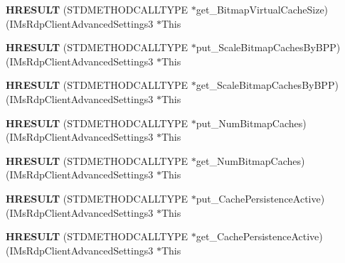 \begin{DoxyCompactItemize}
{\bfseries H\+R\+E\+S\+U\+LT} (S\+T\+D\+M\+E\+T\+H\+O\+D\+C\+A\+L\+L\+T\+Y\+PE $\ast$get\+\_\+\+Bitmap\+Virtual\+Cache\+Size)(I\+Ms\+Rdp\+Client\+Advanced\+Settings3 $\ast$This
\item 
\mbox{\label{struct_i_ms_rdp_client_advanced_settings3_vtbl_a8caf545c6f0f7c16dba2940960bb2e83}} 
{\bfseries H\+R\+E\+S\+U\+LT} (S\+T\+D\+M\+E\+T\+H\+O\+D\+C\+A\+L\+L\+T\+Y\+PE $\ast$put\+\_\+\+Scale\+Bitmap\+Caches\+By\+B\+PP)(I\+Ms\+Rdp\+Client\+Advanced\+Settings3 $\ast$This
\item 
\mbox{\label{struct_i_ms_rdp_client_advanced_settings3_vtbl_aaefbe7367a5bf2621ff417bcd3383613}} 
{\bfseries H\+R\+E\+S\+U\+LT} (S\+T\+D\+M\+E\+T\+H\+O\+D\+C\+A\+L\+L\+T\+Y\+PE $\ast$get\+\_\+\+Scale\+Bitmap\+Caches\+By\+B\+PP)(I\+Ms\+Rdp\+Client\+Advanced\+Settings3 $\ast$This
\item 
\mbox{\label{struct_i_ms_rdp_client_advanced_settings3_vtbl_a9644b4121d99899c38ababfa9cb2e001}} 
{\bfseries H\+R\+E\+S\+U\+LT} (S\+T\+D\+M\+E\+T\+H\+O\+D\+C\+A\+L\+L\+T\+Y\+PE $\ast$put\+\_\+\+Num\+Bitmap\+Caches)(I\+Ms\+Rdp\+Client\+Advanced\+Settings3 $\ast$This
\item 
\mbox{\label{struct_i_ms_rdp_client_advanced_settings3_vtbl_a27dc8b5d223b035928d2c15c8097495b}} 
{\bfseries H\+R\+E\+S\+U\+LT} (S\+T\+D\+M\+E\+T\+H\+O\+D\+C\+A\+L\+L\+T\+Y\+PE $\ast$get\+\_\+\+Num\+Bitmap\+Caches)(I\+Ms\+Rdp\+Client\+Advanced\+Settings3 $\ast$This
\item 
\mbox{\label{struct_i_ms_rdp_client_advanced_settings3_vtbl_aff6d5f14cf61c926004d4a1a72ca54e9}} 
{\bfseries H\+R\+E\+S\+U\+LT} (S\+T\+D\+M\+E\+T\+H\+O\+D\+C\+A\+L\+L\+T\+Y\+PE $\ast$put\+\_\+\+Cache\+Persistence\+Active)(I\+Ms\+Rdp\+Client\+Advanced\+Settings3 $\ast$This
\item 
\mbox{\label{struct_i_ms_rdp_client_advanced_settings3_vtbl_add8091c9b4099c8bd11e9ab1c0b59e82}} 
{\bfseries H\+R\+E\+S\+U\+LT} (S\+T\+D\+M\+E\+T\+H\+O\+D\+C\+A\+L\+L\+T\+Y\+PE $\ast$get\+\_\+\+Cache\+Persistence\+Active)(I\+Ms\+Rdp\+Client\+Advanced\+Settings3 $\ast$This

\end{DoxyCompactItemize}
